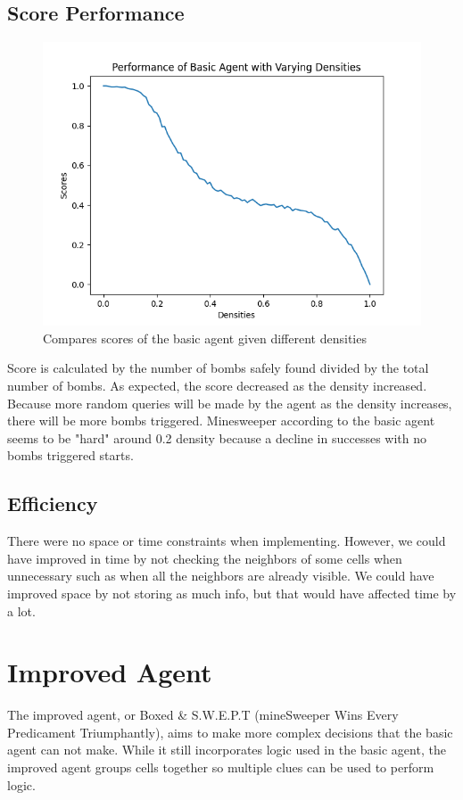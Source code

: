 \documentclass[13pt]{report}
\begin{document}
\subsection*{Score Performance}
\begin{figure}[h]
\includegraphics[width=\textwidth]{Density Performance Test - Basic Agent.png}
\caption{Compares scores of the basic agent given different densities}
\label{Density Performance Test - Basic Agent}
\end{figure}
Score is calculated by the number of bombs safely found divided by the total number of bombs. As expected, the score decreased as the density increased. Because more random queries will be made by the agent as the density increases, there will be more bombs triggered. Minesweeper according to the basic agent seems to be "hard" around 0.2 density because a decline in successes with no bombs triggered starts.

\subsection*{Efficiency}
There were no space or time constraints when implementing. However, we could have improved in time by not checking the neighbors of some cells when unnecessary such as when all the neighbors are already visible. We could have improved space by not storing as much info, but that would have affected time by a lot.

\section*{Improved Agent}
The improved agent, or Boxed \& S.W.E.P.T (mineSweeper Wins Every Predicament Triumphantly), aims to make more complex decisions that the basic agent can not make. While it still incorporates logic used in the basic agent, the improved agent groups cells together so multiple clues can be used to perform logic.
\end{document}
